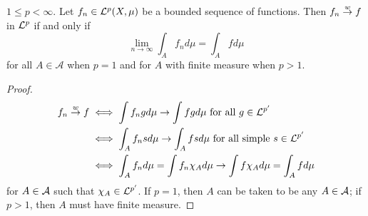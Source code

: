 \begin{proposition}\label{prop:weak_conv_on_set}
    $1\leq p<\infty$. Let $f_n\in\mathcal{L}^p(X,\mu)$ be a bounded sequence 
    of functions. Then $f_n\overset{w}{\to} f$ in $\mathcal{L}^p$ if and only if 
    \begin{equation*}
        \lim_{n\to\infty}\int_A f_nd\mu = \int_A fd\mu
    \end{equation*}
    for all $A\in\mathcal{A}$ when $p=1$ and for $A$ with finite 
    measure when $p>1$.
\end{proposition}
\begin{proof}
    \begin{equation*}
        \begin{split}
            f_n\overset{w}{\to} f 
            &\iff \int f_ngd\mu \to \int fgd\mu \text{ for all } g\in\mathcal{L}^{p'} \\
            &\iff \int_A f_nsd\mu \to \int_A fsd\mu \text{ for all simple } s\in\mathcal{L}^{p'} \\ 
            &\iff \int_A f_nd\mu = \int f_n\chi_Ad\mu \to \int f\chi_Ad\mu = \int_A fd\mu
        \end{split}
    \end{equation*}
    for $A\in\mathcal{A}$ such that $\chi_A\in\mathcal{L}^{p'}$. If $p=1$, then $A$ can be taken 
    to be any $A\in\mathcal{A}$; if $p>1$, then $A$ must have finite measure.
\end{proof}

